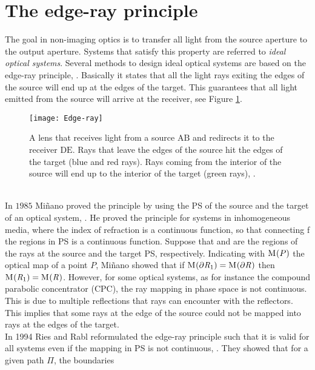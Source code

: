 \section{The edge-ray principle}
The goal in non-imaging optics is to transfer all light from the source aperture to the output aperture. Systems that satisfy this property are referred to \textit{ideal optical systems}.
Several methods to design ideal optical systems are based on the edge-ray principle, \cite{welford1978problem, minano1992new}. 
Basically it states that all the light rays exiting the edges of the source will end up at the edges of the target. 
This guarantees that all light emitted from the source will arrive at the receiver, see Figure \ref{fig:edge}. 
 \begin{figure}[h]
  \begin{center}
  \texttt{[image: Edge-ray]}%
  \end{center}
  \caption{A lens that receives light from a source $\textrm{A}\textrm{B}$ and redirects it to the receiver $\textrm{D}\textrm{E}$. 
Rays that leave the edges of the source hit the edges of the target (blue and red rays). Rays coming from the interior of the source will end up to the interior of the target (green rays), \cite{wiki2}.}
  \label{fig:edge}
\end{figure}
\\ \indent
In $1985$ Mi{\~n}ano proved the principle by using the PS of the source and the target of an optical system, \cite{minano1986design}. He proved the principle for systems in inhomogeneous media, where the index of refraction is a continuous function, so that connecting f the regions in PS is a continuous function.
Suppose that  and  are the regions of the rays at the source and the target PS, respectively. 
Indicating with $\mathrm{M}_{\textit{}}(P)$ the optical map of a point $P$, Mi{\~n}ano showed that if $\mathrm{M}_{\textit{}}(\partial\mbox{$\emph{R}_{\textit{$1$}}$})=\mathrm{M}_{\textit{}}(\partial\mbox{$\emph{R}_{\textit{}}$})$ then $\mathrm{M}_{\textit{}}(\mbox{$\emph{R}_{\textit{$1$}}$})=\mathrm{M}_{\textit{}}(\mbox{$\emph{R}_{\textit{}}$})$. However, for some optical systems, as for instance the compound parabolic concentrator (CPC), the ray mapping in phase space is not continuous. This is due to multiple reflections that rays can encounter with the reflectors. 
This implies that some rays at the edge of the source could not be mapped into rays at the edges of the target. \\ \indent 
In 1994 Ries and Rabl reformulated the edge-ray principle such that it is valid for all systems even if the mapping in PS is not continuous, \cite{Ries:2}. They showed that for a given path $\Pi$, the boundaries
